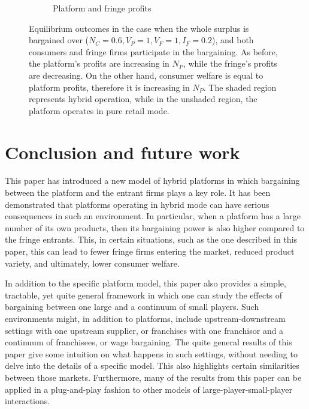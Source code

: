 \documentclass[a4paper]{article}
\begin{document}
\begin{figure}
\begin{subfigure}[b]{0.45\textwidth}
        \caption{Platform and fringe profits}
        \label{fig:profits_full_surplus_two_sided}
    \end{subfigure}
    \caption{Equilibrium outcomes in the case when the whole surplus is bargained over ($N_C = 0.6, V_P = 1, V_F = 1, I_F = 0.2$), and both consumers and fringe firms participate in the bargaining. As before, the platform's profits are increasing in $N_P$, while the fringe's profits are decreasing. On the other hand, consumer welfare is equal to platform profits, therefore it is increasing in $N_P$. The shaded region represents hybrid operation, while in the unshaded region, the platform operates in pure retail mode.}
    \label{fig:equilibrium_full_surplus_two_sided}
\end{figure}

\section{Conclusion and future work}
\label{sec:conclusion}

This paper has introduced a new model of hybrid platforms in which bargaining between the platform and the entrant firms plays a key role.
It has been demonstrated that platforms operating in hybrid mode can have serious consequences in such an environment.
In particular, when a platform has a large number of its own products, then its bargaining power is also higher compared to the fringe entrants.
This, in certain situations, such as the one described in this paper, this can lead to fewer fringe firms entering the market, reduced product variety, and ultimately, lower consumer welfare.

In addition to the specific platform model, this paper also provides a simple, tractable, yet quite general framework in which one can study the effects of bargaining between one large and a continuum of small players.
Such environments might, in addition to platforms, include upstream-downstream settings with one upstream supplier, or franchises with one franchisor and a continuum of franchisees, or wage bargaining.
The quite general results of this paper give some intuition on what happens in such settings, without needing to delve into the details of a specific model.
This also highlights certain similarities between those markets.
Furthermore, many of the results from this paper can be applied in a plug-and-play fashion to other models of large-player-small-player interactions.
\end{document}
